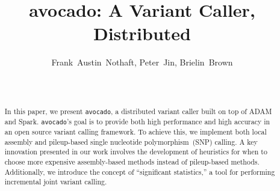 \documentclass{acm_proc_article-sp}
\begin{document}
\title{avocado: A Variant Caller, Distributed}
%
%
%
%
%

%
\author{
%
%
\alignauthor
Frank~Austin~Nothaft, Peter~Jin, Brielin~Brown\\
       \\
       \\
}

\maketitle

\begin{abstract}
In this paper, we present \texttt{avocado}, a distributed variant caller built on top of ADAM and Spark. \texttt{avocado}'s goal is to provide
both high performance and high accuracy in an open source variant calling framework. To achieve this, we implement both local assembly
and pileup-based single nucleotide polymorphism~(SNP) calling. A key innovation presented in our work involves the development of
heuristics for when to choose more expensive assembly-based methods instead of pileup-based methods. Additionally, we introduce the
concept of ``significant statistics,'' a tool for performing incremental joint variant calling.
\end{abstract}
\end{document}

